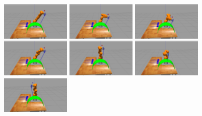 \begin{center}
\begin{figure}[H]
\centering
\includegraphics[width=0.3\textwidth]{images/robot_planner2b/robot_planner2b_1}
\includegraphics[width=0.3\textwidth]{images/robot_planner2b/robot_planner2b_2}
\includegraphics[width=0.3\textwidth]{images/robot_planner2b/robot_planner2b_3}\\
\includegraphics[width=0.3\textwidth]{images/robot_planner2b/robot_planner2b_4}
\includegraphics[width=0.3\textwidth]{images/robot_planner2b/robot_planner2b_5}
\includegraphics[width=0.3\textwidth]{images/robot_planner2b/robot_planner2b_6}\\
\includegraphics[width=0.3\textwidth]{images/robot_planner2b/robot_planner2b_7}

\end{figure}
\end{center}
